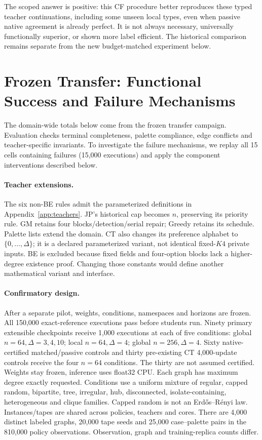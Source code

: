\documentclass[10pt]{article}
\begin{document}
The scoped answer is positive: this CF procedure better reproduces these
typed teacher continuations, including some unseen local types, even when
passive native agreement is already perfect. It is not always necessary,
universally functionally superior, or shown more label efficient. The historical comparison remains separate from the new budget-matched
experiment below.






\section{Frozen Transfer: Functional Success and Failure Mechanisms}\label{sec:generalization}
The domain-wide totals below come from the frozen transfer campaign.
Evaluation checks terminal completeness, palette compliance, edge conflicts
and teacher-specific invariants. To investigate the failure mechanisms,
we replay all 15 cells containing failures (15,000 executions) and apply
the component interventions described below.
\paragraph{Teacher extensions.}
The six non-BE rules admit the parameterized definitions in
Appendix~\ref{app:teachers}. JP's historical cap becomes $n$, preserving its
priority rule. GM retains four blocks/detection/serial repair; Greedy retains
its schedule. Palette lists extend the domain. CT also changes its preference
alphabet to $\{0,\ldots,\Delta\}$; it is a declared parameterized variant,
not identical fixed-$K4$ private inputs. BE is excluded because fixed fields
and four-option blocks lack a higher-degree existence proof. Changing those
constants would define another mathematical variant and interface.

\paragraph{Confirmatory design.}
After a separate pilot, weights, conditions, namespaces and horizons are
frozen. All 150,000 exact-reference executions pass before students run.
Ninety primary extensible checkpoints receive 1,000 executions at each of
five conditions: global $n=64,\Delta=3,4,10$; local $n=64,\Delta=4$;
global $n=256,\Delta=4$. Sixty native-certified matched/passive controls
and thirty pre-existing CT 4,000-update controls receive the four $n=64$
conditions. The thirty are not assumed certified. Weights stay frozen,
inference uses float32 CPU.
Each graph has maximum degree exactly requested. Conditions use a uniform
mixture of regular, capped random, bipartite, tree, irregular, hub,
disconnected, isolate-containing, heterogeneous and clique families. Capped
random is not an Erd\H{o}s--R\'enyi law. Instances/tapes are shared across
policies, teachers and cores. There are 4,000 distinct labeled graphs,
20,000 tape seeds and 25,000 case--palette pairs in the 810,000 policy
observations. Observation, graph and training-replica counts differ.
\end{document}
